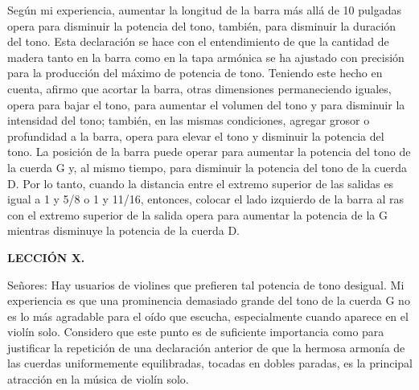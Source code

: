 \documentclass[12pt]{book}
\begin{document}
Según mi experiencia, aumentar la longitud de la barra más allá de 10 pulgadas opera para disminuir la potencia del tono, también, para disminuir la duración del tono. Esta declaración se hace con el entendimiento de que la cantidad de madera tanto en la barra como en la tapa armónica se ha ajustado con precisión para la producción del máximo de potencia de tono. Teniendo este hecho en cuenta, afirmo que acortar la barra, otras dimensiones permaneciendo iguales, opera para bajar el tono, para aumentar el volumen del tono y para disminuir la intensidad del tono; también, en las mismas condiciones, agregar grosor o profundidad a la barra, opera para elevar el tono y disminuir la potencia del tono. La posición de la barra puede operar para aumentar la potencia del tono de la cuerda G y, al mismo tiempo, para disminuir la potencia del tono de la cuerda D. Por lo tanto, cuando la distancia entre el extremo superior de las salidas es igual a 1 y 5/8 o 1 y 11/16, entonces, colocar el lado izquierdo de la barra al ras con el extremo superior de la salida opera para aumentar la potencia de la G mientras disminuye la potencia de la cuerda D.

\textbf{LECCIÓN X.}

Señores: Hay usuarios de violines que prefieren tal potencia de tono desigual. Mi experiencia es que una prominencia demasiado grande del tono de la cuerda G no es lo más agradable para el oído que escucha, especialmente cuando aparece en el violín solo. Considero que este punto es de suficiente importancia como para justificar la repetición de una declaración anterior de que la hermosa armonía de las cuerdas uniformemente equilibradas, tocadas en dobles paradas, es la principal atracción en la música de violín solo.
\end{document}
